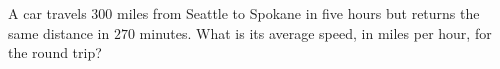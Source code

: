 A car travels $300$ miles from Seattle to Spokane in five hours but returns the same distance in $270$ minutes. What is its average speed, in miles per hour, for the round trip?
